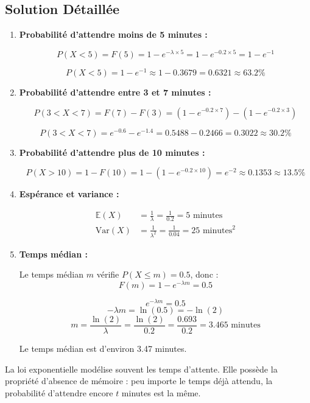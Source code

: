 \documentclass[11pt,a4paper]{article}
\newcommand{\Var}{\text{Var}}
\newcommand{\E}{\mathbb{E}}
\begin{document}
\subsection{Solution Détaillée}

\begin{enumerate}
    \item \textbf{Probabilité d'attendre moins de 5 minutes :}
    
    $$P(X < 5) = F(5) = 1 - e^{-\lambda \times 5} = 1 - e^{-0.2 \times 5} = 1 - e^{-1}$$
    
    $$P(X < 5) = 1 - e^{-1} \approx 1 - 0.3679 = 0.6321 \approx 63.2\%$$
    
    \item \textbf{Probabilité d'attendre entre 3 et 7 minutes :}
    
    $$P(3 < X < 7) = F(7) - F(3) = (1 - e^{-0.2 \times 7}) - (1 - e^{-0.2 \times 3})$$
    
    $$P(3 < X < 7) = e^{-0.6} - e^{-1.4} = 0.5488 - 0.2466 = 0.3022 \approx 30.2\%$$
    
    \item \textbf{Probabilité d'attendre plus de 10 minutes :}
    
    $$P(X > 10) = 1 - F(10) = 1 - (1 - e^{-0.2 \times 10}) = e^{-2} \approx 0.1353 \approx 13.5\%$$
    
    \item \textbf{Espérance et variance :}
    
    \begin{align}
    \E(X) &= \frac{1}{\lambda} = \frac{1}{0.2} = 5 \text{ minutes} \\
    \Var(X) &= \frac{1}{\lambda^2} = \frac{1}{0.04} = 25 \text{ minutes}^2
    \end{align}
    
    \item \textbf{Temps médian :}
    
    Le temps médian $m$ vérifie $P(X \leq m) = 0.5$, donc :
    $$F(m) = 1 - e^{-\lambda m} = 0.5$$
    
    $$e^{-\lambda m} = 0.5$$
    $$-\lambda m = \ln(0.5) = -\ln(2)$$
    $$m = \frac{\ln(2)}{\lambda} = \frac{\ln(2)}{0.2} = \frac{0.693}{0.2} = 3.465 \text{ minutes}$$
    
    Le temps médian est d'environ 3.47 minutes.
\end{enumerate}

\begin{astucebox}
La loi exponentielle modélise souvent les temps d'attente. Elle possède la propriété d'absence de mémoire : peu importe le temps déjà attendu, la probabilité d'attendre encore $t$ minutes est la même.
\end{astucebox}
\end{document}
